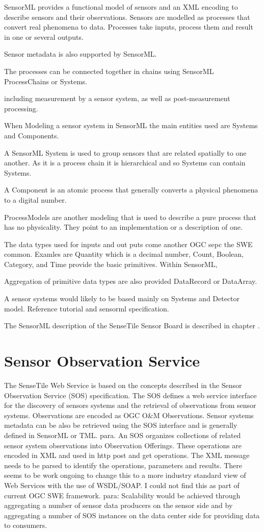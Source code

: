 \documentclass[]{final_report}
\begin{document}
SensorML provides a functional model of sensors and an XML encoding to describe sensors and their observations.
Sensors are modelled as processes that convert real phenomena to data. Processes take inputs, process them and result in one or several outputs.

Sensor metadata is also supported by SensorML.  

The processes can be connected together in chains using SensorML ProcessChains or Systems. 

including measurement by a sensor system, as well as post-measurement
processing.

When Modeling a sensor system in SensorML the main entities used are Systems and Components. 

A SensorML System is used to group sensors that are related spatially to one another.  As it is a process chain it is hierarchical and so Systems can contain Systems.

A Component is an atomic process that generally converts a physical phenomena to a digital number. 

ProcessModels are another modeling that is used to describe a pure process that has no physicality. They point to an implementation or a description of one.

The data types used for inputs and out puts come another OGC sepc the SWE common. Examles are Quantity which is a decimal number, Count, Boolean, Category, and Time provide the basic primitives. Within SensorML, 

Aggregation of primitive data types are also provided DataRecord or DataArray.

A sensor systems would likely to be based mainly on Systems and
Detector model. Reference tutorial and sensorml specification.

The SensorML description of the SenseTile Sensor Board is described in chapter .

\section{Sensor Observation Service}
The SenseTile Web Service is based on the concepts described in the Sensor Observation Service (SOS) specification. The SOS defines a web service interface for the discovery of sensors systems and the retrieval of observations from sensor systems.  Observations are encoded as OGC O\&M Observations. Sensor systems metadata can be also be retrieved using the SOS interface and is generally defined in SensorML or TML.
para. An SOS organizes collections of related sensor system observations into Observation
Offerings. These operations are encoded in XML and used in http post and get operations. The XML message needs to be parsed to identify the operations, parameters and results. There seems to be work ongoing to change this to a more industry standard view of Web Services with the use of WSDL/SOAP. I could not find this as part of current OGC SWE framework.
para: Scalability would be achieved through aggregating a number of
sensor data producers on the sensor side and by aggregating a number of SOS instances
on the data center side for providing data to consumers. 
\end{document}
